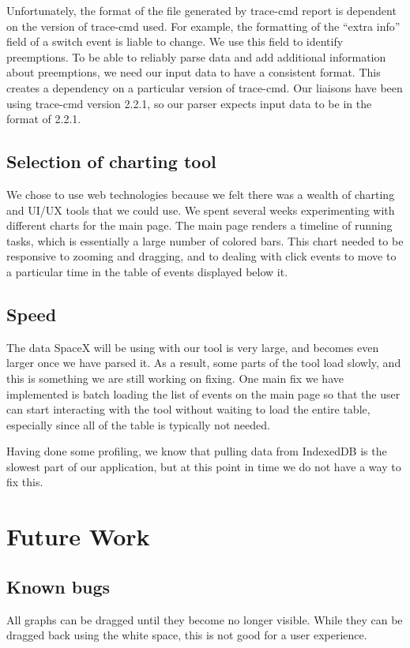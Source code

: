 \documentclass{hmcclinic}
\begin{document}
  Unfortunately, the format of the file generated by trace-cmd report is
  dependent on the version of trace-cmd used. For example, the formatting of the
  ``extra info'' field of a switch event is liable to change. We use this
  field to identify preemptions. To be able to reliably parse data and add
  additional information about preemptions, we need our input data to have
  a consistent format. This creates a dependency on a particular version
  of trace-cmd. Our liaisons have been using trace-cmd version 2.2.1, so
  our parser expects input data to be in the format of 2.2.1.
\section{Selection of charting tool} %
  We chose to use web technologies because we felt there was a wealth of
  charting and UI/UX tools that we could use. We spent several weeks
  experimenting with different charts for the main page. The main page renders a
  timeline of running tasks, which is essentially a large number of colored
  bars. This chart needed to be responsive to zooming and dragging, and to
  dealing with click events to move to a particular time in the table of events
  displayed below it.
\section{Speed} %
The data SpaceX will be using with our tool is very large, and becomes even
larger once we have parsed it. As a result, some parts of the tool load slowly,
and this is something we are still working on fixing. One main fix we have
implemented is batch loading the list of events on the main page so that the
user can start interacting with the tool without waiting to load the entire
table, especially since all of the table is typically not needed.

Having done some profiling, we know that pulling data from IndexedDB is the
slowest part of our application, but at this point in time we do not have a way
to fix this.

\chapter{Future Work}
\section{Known bugs}
  
All graphs can be dragged until they become no longer visible. While they can
be dragged back using the white space, this is not good for a user experience.
\end{document}
